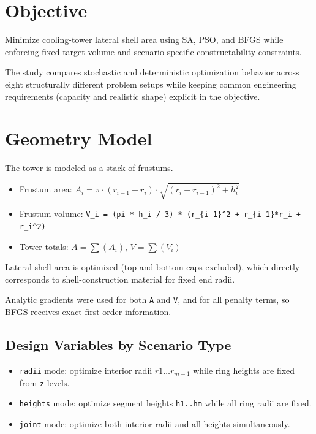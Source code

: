 
\chapter{Objective}

Minimize cooling-tower lateral shell area using SA, PSO, and BFGS while enforcing fixed target volume and scenario-specific constructability constraints.

The study compares stochastic and deterministic optimization behavior across eight structurally different problem setups while keeping common engineering requirements (capacity and realistic shape) explicit in the objective.


\chapter{Geometry Model}

The tower is modeled as a stack of frustums.


\begin{itemize}
\item Frustum area: \(A_{i} = \pi  \cdot  (r_{i-1} + r_{i})  \cdot  \sqrt{(r_{i} - r_{i-1})^2 + h_{i}^2}\)
\item Frustum volume: \texttt{V\_i = (pi * h\_i / 3) * (r\_\{i-1\}\textasciicircum{}2 + r\_\{i-1\}*r\_i + r\_i\textasciicircum{}2)}
\item Tower totals: \(A = \sum(A_{i})\), \(V = \sum(V_{i})\)
\end{itemize}

Lateral shell area is optimized (top and bottom caps excluded), which directly corresponds to shell-construction material for fixed end radii.

Analytic gradients were used for both \texttt{A} and \texttt{V}, and for all penalty terms, so BFGS receives exact first-order information.


\section{Design Variables by Scenario Type}

\begin{itemize}
\item \texttt{radii} mode: optimize interior radii \(r1\ldots r_{m-1}\) while ring heights are fixed from \texttt{z} levels.
\item \texttt{heights} mode: optimize segment heights \texttt{h1..hm} while all ring radii are fixed.
\item \texttt{joint} mode: optimize both interior radii and all heights simultaneously.
\end{itemize}

